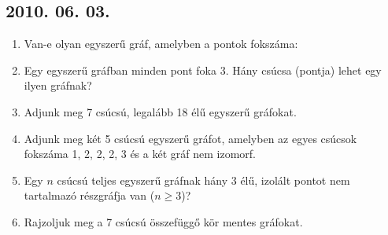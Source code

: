 \subsection*{2010. 06. 03.}
\begin{enumerate}
\item Van-e olyan egyszerű gráf, amelyben a pontok fokszáma:
\item Egy egyszerű gráfban minden pont foka 3. Hány csúcsa (pontja) lehet egy ilyen gráfnak?
\item Adjunk meg 7 csúcsú, legalább 18 élű egyszerű gráfokat.
\item Adjunk meg két 5 csúcsú egyszerű gráfot, amelyben az egyes csúcsok fokszáma 1, 2, 2, 2, 3 és a két gráf nem izomorf.
\item Egy $n$ csúcsú teljes egyszerű gráfnak hány 3 élű, izolált pontot nem tartalmazó részgráfja van ($n\geq 3$)?
\item Rajzoljuk meg a 7 csúcsú összefüggő kör mentes gráfokat.
\end{enumerate}



